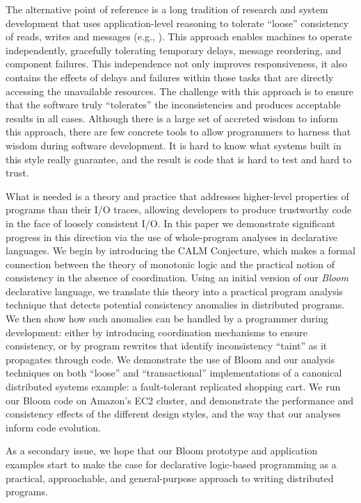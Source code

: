 The alternative point of reference is a long tradition of research and system development that uses application-level reasoning to tolerate ``loose'' consistency of reads, writes and messages (e.g., \cite{sagas,base,acid20,ec}).  This approach enables machines to operate independently, gracefully tolerating temporary delays, message reordering, and component failures.  This independence not only improves responsiveness, it also contains the effects of delays and failures within those tasks that are directly accessing the unavailable resources.  The challenge with this approach is to ensure that the software truly ``tolerates'' the inconsistencies and produces acceptable results in all cases.  Although there is a large set of accreted wisdom to inform this approach, there are few concrete tools to allow programmers to harness that wisdom during software development.  It is hard to know what systems built in this style really guarantee, and the result is code that is hard to test and hard to trust.  

What is needed is a theory and practice that addresses higher-level properties of programs than their I/O traces, allowing developers to produce trustworthy code in the face of loosely consistent I/O.  In this paper we demonstrate significant progress in this direction via the use of whole-program analyses in declarative languages.  We begin by introducing the CALM Conjecture, which makes a formal connection between the theory of monotonic logic and the practical notion of consistency in the absence of coordination.  Using an initial version of our {\em Bloom} declarative language, we translate this theory into a practical program analysis technique that detects potential consistency anomalies in distributed programs.  We then show how such anomalies can be handled by a programmer during development: either by introducing coordination mechanisms to ensure consistency, or by program rewrites that identify inconsistency ``taint'' as it propagates through code.  We demonstrate the use of Bloom and our analysis techniques on both ``loose'' and ``transactional'' implementations of a canonical distributed systems example: a fault-tolerant replicated shopping cart.  We run our Bloom code on Amazon's EC2 cluster, and demonstrate the performance and consistency effects of the different design styles, and the way that our analyses inform code evolution.

As a secondary issue, we hope that our Bloom prototype and application examples start to make the case for declarative logic-based programming as a practical, approachable, and general-purpose approach to writing distributed programs.